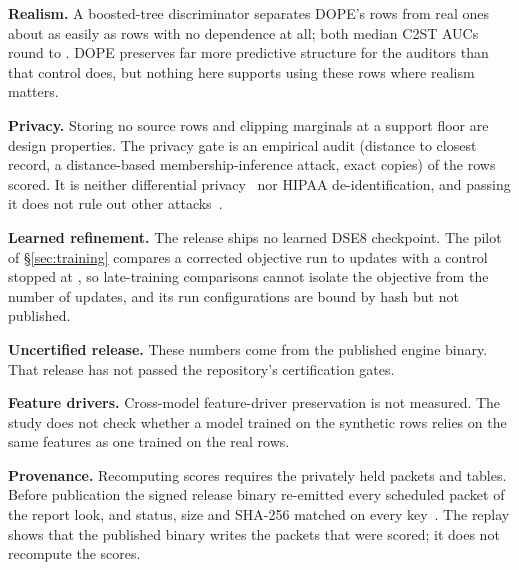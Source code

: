 \documentclass[10pt,letterpaper,twocolumn]{article}
\newcommand{\runin}[1]{\par\smallskip\noindent\textbf{#1.}\hspace{0.45em}\ignorespaces}
\newcommand{\cli}[1]{{\ttfamily\fontsize{8.9}{11}\selectfont #1}}
\begin{document}
\runin{Realism} A boosted-tree discriminator separates DOPE's rows from real ones about as easily as rows with no dependence at all; both median C2ST AUCs round to . DOPE preserves far more predictive structure for the auditors than that control does, but nothing here supports using these rows where realism matters.

\runin{Privacy} Storing no source rows and clipping marginals at a support floor are design properties. The privacy gate is an empirical audit (distance to closest record, a distance-based membership-inference attack, exact copies) of the rows scored. It is neither differential privacy~\cite{dwork2006calibrating} nor HIPAA de-identification, and passing it does not rule out other attacks~\cite{stadler2022groundhog}.

\runin{Learned refinement} The release ships no learned \cli{DSE8} checkpoint. The pilot of \S\ref{sec:training} compares a corrected objective run to  updates with a control stopped at , so late-training comparisons cannot isolate the objective from the number of updates, and its run configurations are bound by hash but not published.

\runin{Uncertified release} These numbers come from the published engine binary. That release has not passed the repository's certification gates.

\runin{Feature drivers} Cross-model feature-driver preservation is not measured. The study does not check whether a model trained on the synthetic rows relies on the same features as one trained on the real rows.

\runin{Provenance} Recomputing scores requires the privately held packets and tables. Before publication the signed release binary re-emitted every scheduled packet of the report look, and status, size and SHA-256 matched on every key~\cite{dope2026v3release}. The replay shows that the published binary writes the packets that were scored; it does not recompute the scores.
\end{document}
